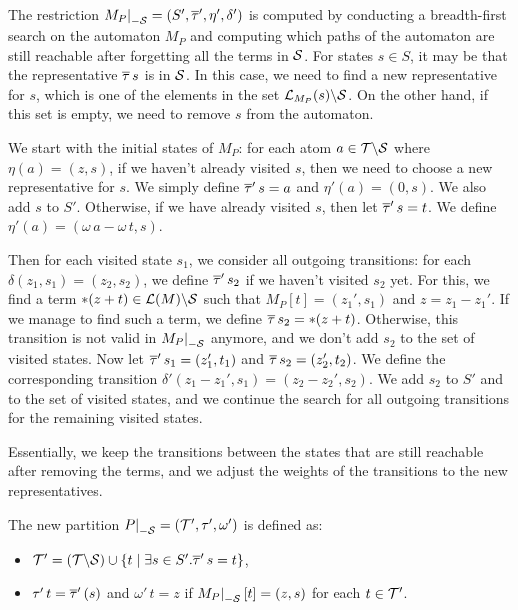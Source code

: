 The restriction $\restr{M_P}{-\Set} = (S', \otau', \eta', \delta')$ is computed by conducting a breadth-first search on the automaton $M_P$
and computing which paths of the automaton are still reachable after forgetting all the terms in $\mathcal{S}$.
For states $s \in S$, it may be that the representative $\overline{\tau}\,s$ is in $\mathcal{S}$.
In this case, we need to find a new representative for $s$, which is one of the elements in the set
$\mathcal{L}_{M_P}(s) \backslash \mathcal{S}$. On the other hand, if this set is empty,
we need to remove $s$ from the automaton.

We start with the initial states of $M_P$:
for each atom $a \in \mathcal{T} \backslash \mathcal{S}$ where $\eta(a) = (z, s)$, if we haven't already visited $s$, then we need to choose a new representative for $s$. We simply define $\overline{\tau}'\,s = a$ and $\eta'(a) = (0, s)$.
We also add $s$ to $S'$.
Otherwise, if we have already visited $s$, then let $\overline{\tau}'\,s = t$. We define $\eta'(a) = (\omega\,a - \omega\,t, s)$.

Then for each visited state $s_1$, we consider all outgoing transitions: for each $\delta(z_1, s_1) = (z_2, s_2)$,
we define $\overline{\tau}'\,s_2$ if we haven't visited $s_2$ yet.
For this, we find a term $*(z+t)\in \mathcal{L}(M)\backslash \mathcal{S}$ such that $M_P[t] = (z_1', s_1)$ and $z = z_1 - z_1'$.
If we manage to find such a term, we define $\overline{\tau}\,s_2 = *(z+t)$.
Otherwise, this transition is not valid in $\restr{M_P}{-\Set}$ anymore, and we don't add $s_2$ to the set of visited states.
Now let $\overline{\tau}'\,s_1 = (z_1', t_1)$ and $\overline{\tau}\,s_2 = (z_2', t_2)$.
We define the corresponding transition $\delta'(z_1 - z_1', s_1) = (z_2 - z_2', s_2)$.
We add $s_2$ to $S'$ and to the set of visited states, and we continue the search for all outgoing transitions for the remaining visited states.

Essentially, we keep the transitions between the states that are still reachable after removing the terms, and we adjust the weights of the transitions to the new representatives.

The new partition $\restr{P}{-\Set} = (\T', \tau', \omega')$ is defined as:
\begin{itemize}
    \item $\mathcal{T}' = (\mathcal{T} \backslash \mathcal{S}) \cup \{t \mid \exists s \in S' . \overline{\tau}'\,s = t\}$,
    \item $\tau'\,t = \overline{\tau}'\,(s)$ and $\omega'\,t = z$ if $\restr{M_P}{-\Set}[t] = (z,s)$ for each $t\in \mathcal{T}'$.
\end{itemize}

